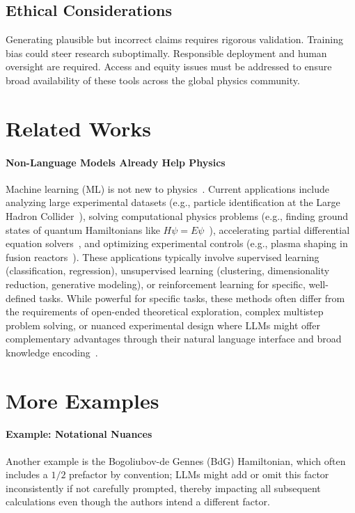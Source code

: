 \subsection*{Ethical Considerations}
\label{sec:ethics}
Generating plausible but incorrect claims requires rigorous validation. Training bias could steer research suboptimally. Responsible deployment and human oversight are required. Access and equity issues must be addressed to ensure broad availability of these tools across the global physics community.

\section{Related Works}
\paragraph{Non-Language Models Already Help Physics}
Machine learning (ML) is not new to physics~\cite{Carleo2019Machine}. Current applications include analyzing large experimental datasets (e.g., particle identification at the Large Hadron Collider~\cite{Guest2018Deep}), solving computational physics problems (e.g., finding ground states of quantum Hamiltonians like $H\psi = E\psi$~\cite{Carleo2017Solving,Glasser2018NeuralNetwork}), accelerating partial differential equation solvers~\cite{Karniadakis2021Physicsinformed}, and optimizing experimental controls (e.g., plasma shaping in fusion reactors~\cite{Degrave2022Magnetic}).
These applications typically involve supervised learning (classification, regression), unsupervised learning (clustering, dimensionality reduction, generative modeling), or reinforcement learning for specific, well-defined tasks. While powerful for specific tasks, these methods often differ from the requirements of open-ended theoretical exploration, complex multistep problem solving, or nuanced experimental design where LLMs might offer complementary advantages through their natural language interface and broad knowledge encoding~\cite{Schaeffer2023Are,Lewkowycz2022Solving}.
\section{More Examples}
\paragraph{Example: Notational Nuances}
Another example is the Bogoliubov-de Gennes (BdG) Hamiltonian, which often includes a $1/2$ prefactor by convention; LLMs might add or omit this factor inconsistently if not carefully prompted, thereby impacting all subsequent calculations even though the authors intend a different factor.
